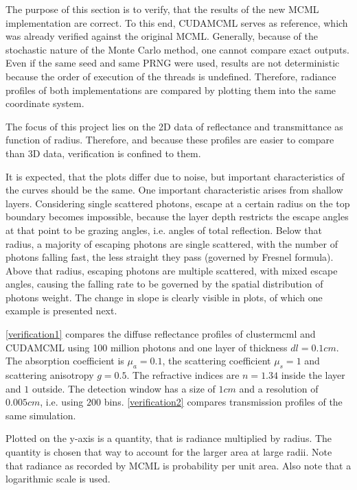 \documentclass[]{article}
\begin{document}
The purpose of this section is to verify, that the results of the new MCML implementation are correct. To this end, CUDAMCML serves as reference, which was already verified against the original MCML. Generally, because of the stochastic nature of the Monte Carlo method, one cannot compare exact outputs. Even if the same seed and same PRNG were used, results are not deterministic because the order of execution of the threads is undefined. Therefore, radiance profiles of both implementations are compared by plotting them into the same coordinate system.

The focus of this project lies on the 2D data of reflectance and transmittance as function of radius. Therefore, and because these profiles are easier to compare than 3D data, verification is confined to them.

It is expected, that the plots differ due to noise, but important characteristics of the curves should be the same. One important characteristic arises from shallow layers. Considering single scattered photons, escape at a certain radius on the top boundary becomes impossible, because the layer depth restricts the escape angles at that point to be grazing angles, i.e. angles of total reflection. Below that radius, a majority of escaping photons are single scattered, with the number of photons falling fast, the less straight they pass (governed by Fresnel formula). Above that radius, escaping photons are multiple scattered, with mixed escape angles, causing the falling rate to be governed by the spatial distribution of photons weight. The change in slope is clearly visible in plots, of which one example is presented next.

\autoref{verification1} compares the diffuse reflectance profiles of clustermcml and CUDAMCML using 100 million photons and one layer of thickness $dl=0.1cm$. The absorption coefficient is $\mu_a=0.1$, the scattering coefficient $\mu_s=1$ and scattering anisotropy $g=0.5$. The refractive indices are $n=1.34$ inside the layer and $1$ outside. The detection window has a size of $1cm$ and a resolution of $0.005cm$, i.e. using $200$ bins. \autoref{verification2} compares transmission profiles of the same simulation.

Plotted on the y-axis is a quantity, that is radiance multiplied by radius. The quantity is chosen that way to account for the larger area at large radii. Note that radiance as recorded by MCML is probability per unit area. Also note that a logarithmic scale is used.
\end{document}
